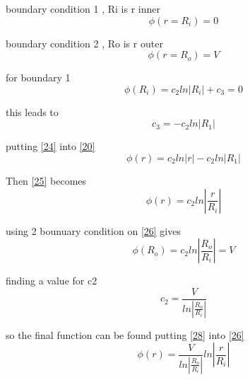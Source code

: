 \documentclass{article}
\begin{document}
boundary condition 1 , Ri is r inner
\begin{equation}
\phi(r=R_i)=0
\label{21}
\end{equation}

boundary condition 2 , Ro is r outer
\begin{equation}
\phi(r=R_o)=V
\label{22}
\end{equation}

for boundary 1
\begin{equation}
\phi(R_i)=c_2ln|R_i| + c_3=0
\label{23}
\end{equation}

this leads to
\begin{equation}
c_3=-c_2ln|R_1|
\label{24}
\end{equation}

putting \ref{24} into \ref{20}
\begin{equation}
\phi(r)=c_2ln|r| - c_2ln|R_1| 
\label{25}
\end{equation}

Then \ref{25} becomes
\begin{equation}
\phi(r)=c_2ln\left|\frac{r}{R_i}\right|
\label{26}
\end{equation}

using 2 bounuary condition on \ref{26} gives
\begin{equation}
\phi(R_o)=c_2ln\left|\frac{R_o}{R_i}\right|=V
\label{27}
\end{equation}

finding a value for c2
\begin{equation}
c_2=\frac{V}{ln\left|\frac{R_o}{R_i}\right|}
\label{28}
\end{equation}

so the final function can be found putting \ref{28} into \ref{26}
\begin{equation}
\phi(r)=\frac{V}{ln\left|\frac{R_o}{R_i}\right|}ln\left|\frac{r}{R_i}\right|
\label{29}
\end{equation}
\end{document}
